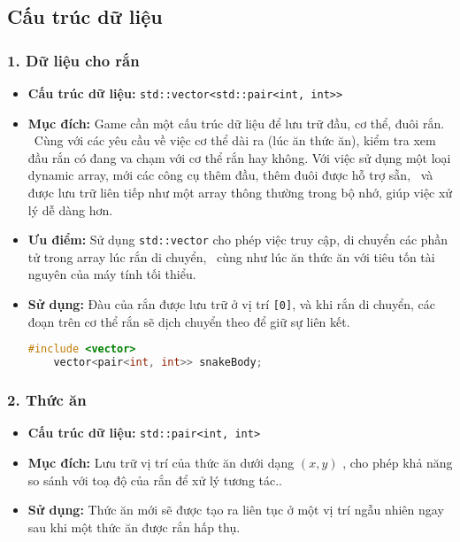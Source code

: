 \documentclass[12pt]{report}
\begin{document}
\subsection*{Cấu trúc dữ liệu}
\subsubsection*{1. Dữ liệu cho rắn}
\begin{itemize}
    \item \textbf{Cấu trúc dữ liệu:} \texttt{std::vector<std::pair<int, int>>}
    \item \textbf{Mục đích:} Game cần một cấu trúc dữ liệu để lưu trữ đầu, cơ thể, đuôi rắn. \
          Cùng với các yêu cầu về việc cơ thể dài ra (lúc ăn thức ăn), kiểm tra xem đầu rắn có đang va chạm với cơ thể rắn hay không.
          Với việc sử dụng một loại dynamic array, mới các công cụ thêm đầu, thêm đuôi được hỗ trợ sẵn, \
          và được lưu trữ liên tiếp như một array thông thường trong bộ nhớ, giúp việc xử lý dễ dàng hơn.
    \item \textbf{Ưu điểm:} Sử dụng \texttt{std::vector} cho phép việc truy cập, di chuyển các phần tử trong array lúc rắn di chuyển, \
          cùng như lúc ăn thức ăn với tiêu tốn tài nguyên của máy tính tối thiểu.
    \item \textbf{Sử dụng:} Đàu của rắn được lưu trữ ở vị trí \texttt{[0]}, và khi rắn di chuyển, các đoạn trên cơ thể rắn sẽ dịch chuyển theo để giữ sự liên kết.
          \begin{footnotesize}
              \begin{lstlisting}[language=C++]
    #include <vector>
    vector<pair<int, int>> snakeBody;
    \end{lstlisting}
          \end{footnotesize}
\end{itemize}

\subsubsection*{2. Thức ăn}
\begin{itemize}
    \item \textbf{Cấu trúc dữ liệu:} \texttt{std::pair<int, int>}
    \item \textbf{Mục đích:} Lưu trữ vị trí của thức ăn dưới dạng $(x, y)$ , cho phép khả năng so sánh với toạ độ của rắn để xử lý tương tác..
    \item \textbf{Sử dụng:} Thức ăn mới sẽ được tạo ra liên tục ở một vị trí ngẫu nhiên ngay sau khi một thức ăn được rắn hấp thụ.
\end{itemize}
\end{document}
